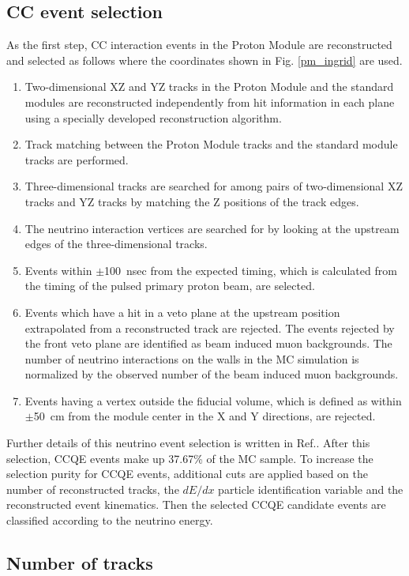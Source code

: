 \documentclass[%
 reprint,
superscriptaddress,
 amsmath,amssymb,
 aps,
]{revtex4-1}
\begin{document}
\subsection{CC event selection}
As the first step, CC interaction events in the Proton Module are reconstructed and selected as follows where the coordinates shown in Fig. \ref{pm_ingrid} are used.
\begin{enumerate}
 \item Two-dimensional XZ and YZ tracks in the Proton Module and the standard modules are reconstructed independently from hit information in each plane using a specially developed reconstruction algorithm.
 \item Track matching between the Proton Module tracks and the standard module tracks are performed.
 \item Three-dimensional tracks are searched for among pairs of two-dimensional XZ tracks and YZ tracks by matching the Z positions of the track edges.
 \item The neutrino interaction vertices are searched for by looking at the upstream edges of the three-dimensional tracks.
 \item Events within $\pm$100~nsec from the expected timing, which is calculated from the timing of the pulsed primary proton beam, are selected.
 \item Events which have a hit in a veto plane at the upstream position extrapolated from a reconstructed track are rejected. The events rejected by the front veto plane are identified as beam induced muon backgrounds. The number of neutrino interactions on the walls in the MC simulation is normalized by the observed number of the beam induced muon backgrounds.
 \item Events having a vertex outside the fiducial volume, which is defined as within $\pm$50~cm from the module center in the X and Y directions, are rejected.
\end{enumerate}
Further details of this neutrino event selection is written in Ref.\cite{ingrid_ccincl}.
After this selection, CCQE events make up 37.67\% of the MC sample.
To increase the selection purity for CCQE events, additional cuts are applied based on the number of reconstructed tracks, the $dE/dx$ particle identification variable and the reconstructed event kinematics.
Then the selected CCQE candidate events are classified according to the neutrino energy.



\subsection{Number of tracks}
\end{document}
